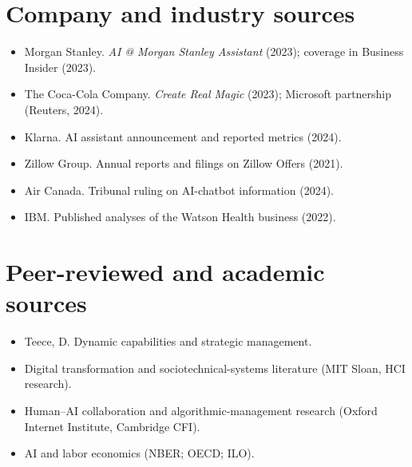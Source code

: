 \section{Company and industry sources}

\begin{itemize}
  \item Morgan Stanley. \textit{AI @ Morgan Stanley Assistant} (2023);
        coverage in Business Insider (2023).
  \item The Coca-Cola Company. \textit{Create Real Magic} (2023); Microsoft
        partnership (Reuters, 2024).
  \item Klarna. AI assistant announcement and reported metrics (2024).
  \item Zillow Group. Annual reports and filings on Zillow Offers (2021).
  \item Air Canada. Tribunal ruling on AI-chatbot information (2024).
  \item IBM. Published analyses of the Watson Health business (2022).
\end{itemize}

\section{Peer-reviewed and academic sources}

\begin{itemize}
  \item Teece, D. Dynamic capabilities and strategic management.
  \item Digital transformation and sociotechnical-systems literature (MIT
        Sloan, HCI research).
  \item Human--AI collaboration and algorithmic-management research
        (Oxford Internet Institute, Cambridge CFI).
  \item AI and labor economics (NBER; OECD; ILO).
\end{itemize}
